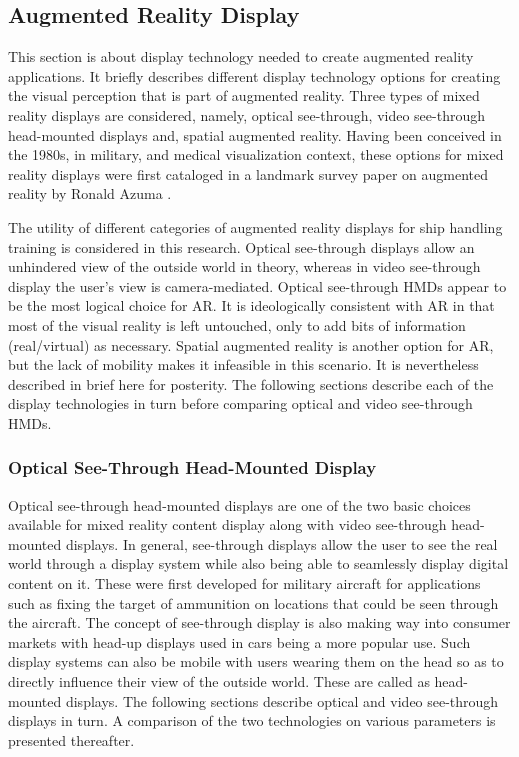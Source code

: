\subsection{Augmented Reality Display}
This section is about display technology needed to create augmented reality applications. It briefly describes different display technology options for creating the visual perception that is part of augmented reality. Three types of mixed reality displays are considered, namely, optical see-through, video see-through head-mounted displays and, spatial augmented reality. Having been conceived in the 1980s, in military, and medical visualization context, these options for mixed reality displays were first cataloged in a landmark survey paper on augmented reality by Ronald Azuma \parencite{azuma1997survey}. 

The utility of different categories of augmented reality displays for ship handling training is considered in this research. Optical see-through displays allow an unhindered view of the outside world in theory, whereas in video see-through display the user's view is camera-mediated. Optical see-through HMDs appear to be the most logical choice for AR. It is ideologically consistent with AR in that most of the visual reality is left untouched, only to add bits of information (real/virtual) as necessary. Spatial augmented reality is another option for AR, but the lack of mobility makes it infeasible in this scenario. It is nevertheless described in brief here for posterity. The following sections describe each of the display technologies in turn before comparing optical and video see-through HMDs. 

\subsubsection{Optical See-Through Head-Mounted Display}
Optical see-through head-mounted displays are one of the two basic choices available for mixed reality content display along with video see-through head-mounted displays. In general, see-through displays allow the user to see the real world through a display system while also being able to seamlessly display digital content on it. These were first developed for military aircraft for applications such as fixing the target of ammunition on locations that could be seen through the aircraft. The concept of see-through display is also making way into consumer markets with head-up displays used in cars being a more popular use. Such display systems can also be mobile with users wearing them on the head so as to directly influence their view of the outside world. These are called as head-mounted displays. The following sections describe optical and video see-through displays in turn. A comparison of the two technologies on various parameters is presented thereafter.

